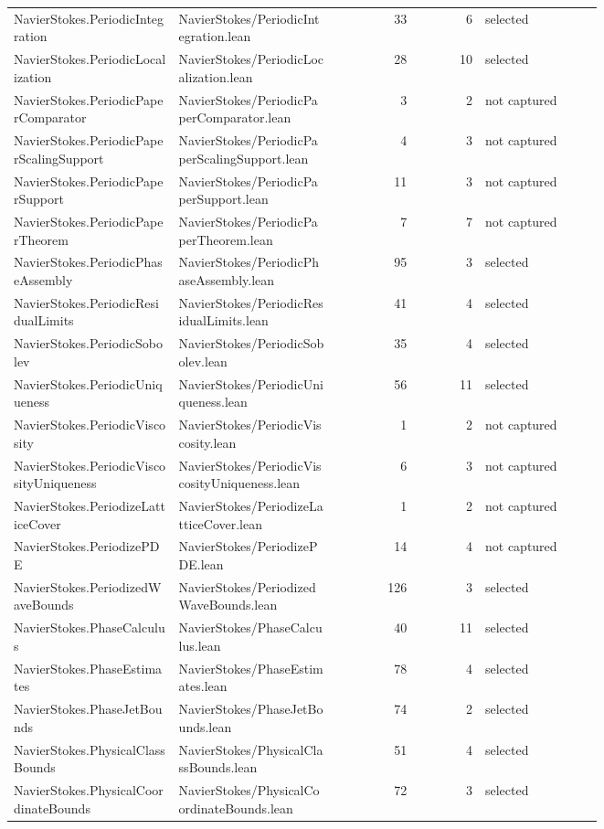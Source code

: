 \documentclass[10pt]{article}
\begin{document}
\begin{longtable}{p{0.28\linewidth}p{0.27\linewidth}r r p{0.20\linewidth}}
NavierStokes.PeriodicIntegration & NavierStokes/PeriodicIntegration.lean & 33 & 6 & selected\\
NavierStokes.PeriodicLocalization & NavierStokes/PeriodicLocalization.lean & 28 & 10 & selected\\
NavierStokes.PeriodicPaperComparator & NavierStokes/PeriodicPaperComparator.lean & 3 & 2 & not captured\\
NavierStokes.PeriodicPaperScalingSupport & NavierStokes/PeriodicPaperScalingSupport.lean & 4 & 3 & not captured\\
NavierStokes.PeriodicPaperSupport & NavierStokes/PeriodicPaperSupport.lean & 11 & 3 & not captured\\
NavierStokes.PeriodicPaperTheorem & NavierStokes/PeriodicPaperTheorem.lean & 7 & 7 & not captured\\
NavierStokes.PeriodicPhaseAssembly & NavierStokes/PeriodicPhaseAssembly.lean & 95 & 3 & selected\\
NavierStokes.PeriodicResidualLimits & NavierStokes/PeriodicResidualLimits.lean & 41 & 4 & selected\\
NavierStokes.PeriodicSobolev & NavierStokes/PeriodicSobolev.lean & 35 & 4 & selected\\
NavierStokes.PeriodicUniqueness & NavierStokes/PeriodicUniqueness.lean & 56 & 11 & selected\\
NavierStokes.PeriodicViscosity & NavierStokes/PeriodicViscosity.lean & 1 & 2 & not captured\\
NavierStokes.PeriodicViscosityUniqueness & NavierStokes/PeriodicViscosityUniqueness.lean & 6 & 3 & not captured\\
NavierStokes.PeriodizeLatticeCover & NavierStokes/PeriodizeLatticeCover.lean & 1 & 2 & not captured\\
NavierStokes.PeriodizePDE & NavierStokes/PeriodizePDE.lean & 14 & 4 & not captured\\
NavierStokes.PeriodizedWaveBounds & NavierStokes/PeriodizedWaveBounds.lean & 126 & 3 & selected\\
NavierStokes.PhaseCalculus & NavierStokes/PhaseCalculus.lean & 40 & 11 & selected\\
NavierStokes.PhaseEstimates & NavierStokes/PhaseEstimates.lean & 78 & 4 & selected\\
NavierStokes.PhaseJetBounds & NavierStokes/PhaseJetBounds.lean & 74 & 2 & selected\\
NavierStokes.PhysicalClassBounds & NavierStokes/PhysicalClassBounds.lean & 51 & 4 & selected\\
NavierStokes.PhysicalCoordinateBounds & NavierStokes/PhysicalCoordinateBounds.lean & 72 & 3 & selected\\

\end{longtable}
\end{document}
